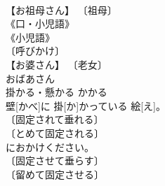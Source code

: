 \documentclass[8pt]{extreport}
\begin{document}
\begin{CJK}{UTF8}{min}
\\	【お祖母さん】 〔祖母〕 
\\	《口・小児語》 
\\	《小児語》 
\\	〔呼びかけ〕 
\\	【お婆さん】 〔老女〕 
\\	おばあさん	
\\	掛かる・懸かる	かかる	
\\	壁[かべ]に 掛[か]かっている 絵[え]。	
\\	〔固定されて垂れる〕 
\\	〔とめて固定される〕 
\\	[⇒ひっかかる 
\\	〔上に置かれる〕 
\\	〔表面に注がれる〕 (液体が) 
\\	(砂などが) 
\\	〔表面が覆われる〕 
\\	〔まわりに巻きつく〕 
\\	〔道具が作動する・道具の機能が働く・機能がセットされる・契約により掛け金が払われる〕 
\\	〔陥る〕 
\\	〔釣針や網につかまる〕 
\\	〔時間・労力などが費やされる〕 
\\	〔金が〕 
\\	〔着手する〕 
\\	〔取り組む〕 
\\	〔不利益を被る〕 
\\	〔課せられる〕 
\\	〔攻撃をしかける〕 
\\	〔(弱者が)挑む〕 
\\	〔働きかけられる〕 
\\	〔作用が及ぶ〕 
\\	〔ある時期・箇所に至る〕 
\\	〔託される・委ねられる・そのこと次第で物事が決まる〕 
\\	〔受診する〕 
\\	〔(心・目などに)留まる〕 
\\	〔扱われる・処理される〕 
\\	〔上演・上映される〕 
\\	〔兼ねる・関連をもつ〕		かかる	
\\	掛ける・懸ける	かける	▲こちらの 席[せき]におかけください。	
\\	〔固定させて垂らす〕 
\\	〔留めて固定させる〕 

\end{CJK}
\end{document}
